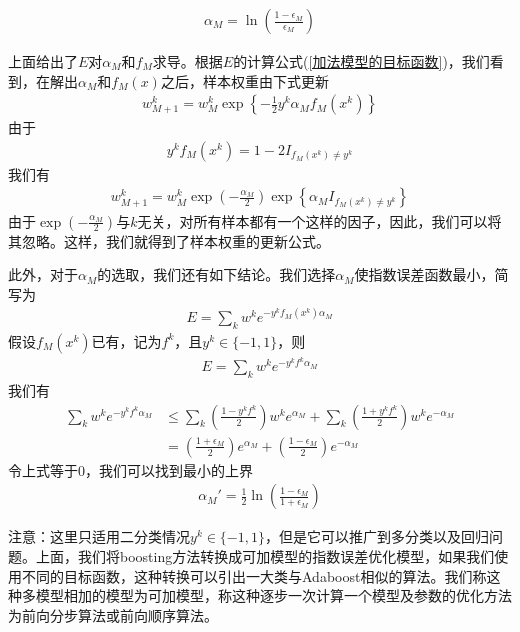          \begin{align*}
          \alpha_M= \ln \left( \frac{1-\epsilon_M}{\epsilon_M} \right)
          \end{align*}
          \par
          上面给出了$E$对$\alpha_M$和$f_M$求导。根据$E$的计算公式(\ref{加法模型的目标函数})，我们看到，在解出$\alpha_M$和$f_M(x)$之后，样本权重由下式更新
          \begin{align*}
          w_{M+1}^k = w_M^k \exp\left\{-\frac{1}{2} y^k \alpha_M f_M(x^k)  \right\}
          \end{align*}
          由于
          \begin{align*}
          y^k f_M(x^k) = 1-2 I_{f_M(x^k)\neq y^k}
          \end{align*}
          我们有
          \begin{align*}
          w_{M+1}^k = w_M^k\exp \left(- \frac{\alpha_M}{2} \right) \exp\left\{\alpha_M I_{f_M(x^k) \neq y^k}\right\}
          \end{align*}
          由于$\exp (- \frac{\alpha_M}{2} )$与$k$无关，对所有样本都有一个这样的因子，因此，我们可以将其忽略。这样，我们就得到了样本权重的更新公式。
          \par
          此外，对于$\alpha_M$的选取，我们还有如下结论。我们选择$\alpha_M$使指数误差函数最小，简写为
          \begin{align*}
          E = \sum_k w^k e^{-y^k f_M(x^k)\alpha_M}
          \end{align*}
          假设$f_M(x^k)$已有，记为$f^k$，且$y^k\in \{-1,1\}$，则
          \begin{align*}
          E = \sum_k w^k e^{-y^k f^k \alpha_M}
          \end{align*}
          我们有
          \begin{align*}
          \sum_k w^k e^{-y^k f^k \alpha_M} & \leqslant \sum_k \left( \frac{1-y^k f^k}{2} \right)w^k e^{\alpha_M} + \sum_k \left( \frac{1+y^k f^k}{2} \right) w^k e^{-\alpha_M} \\
          & = \left( \frac{1+\epsilon_M}{2} \right) e^{\alpha_M} + \left( \frac{1-\epsilon_M}{2} \right) e^{-\alpha_M}
          \end{align*}
          令上式等于0，我们可以找到最小的上界
          \begin{align*}
          \alpha_M' = \frac{1}{2}\ln \left( \frac{1-\epsilon_M}{1+\epsilon_M} \right)
          \end{align*}
          \par
          注意：这里只适用二分类情况$y^k\in \{-1,1\}$，但是它可以推广到多分类以及回归问题。上面，我们将boosting方法转换成可加模型的指数误差优化模型，如果我们使用不同的目标函数，这种转换可以引出一大类与Adaboost相似的算法。我们称这种多模型相加的模型为可加模型，称这种逐步一次计算一个模型及参数的优化方法为前向分步算法或前向顺序算法。

